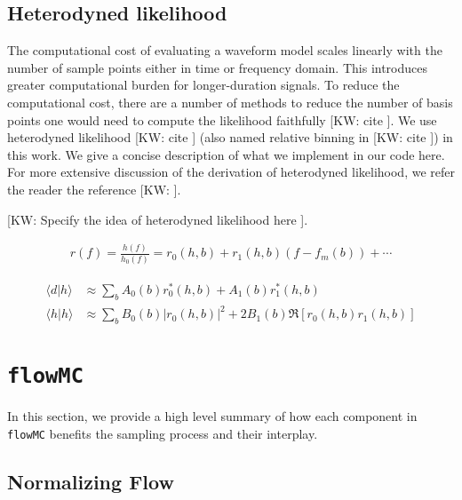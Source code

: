 \documentclass[twocolumn]{aastex631}
\newcommand{\kw}[1]{{\color{rb4}[KW: #1 ]}}
\begin{document}
\subsection{Heterodyned likelihood}

The computational cost of evaluating a waveform model scales linearly with the
number of sample points either in time or frequency domain. This introduces
greater computational burden for longer-duration signals. To reduce the
computational cost, there are a number of methods to reduce the number of basis
points one would need to compute the likelihood faithfully \kw{cite}. We use
heterodyned likelihood \kw{cite} (also named relative binning in \kw{cite}) in
this work. We give a concise description of what we implement in our code here.
For more extensive discussion of the derivation of heterodyned likelihood, we
refer the reader the reference \kw{}.

\kw{Specify the idea of heterodyned likelihood here}.

\begin{align}
r(f) = \frac{h(f)}{h_0(f)} = r_0(h,b) + r_1(h,b)(f- f_m(b)) + \cdots
\end{align}

\begin{align}
    \langle d|h \rangle &\approx \sum_b A_0(b) r^*_0(h,b) + A_1(b) r^*_1(h,b) \nonumber \\
    \langle h|h \rangle &\approx \sum_b B_0(b) |r_0(h,b)|^2 + 2 B_1(b) \Re[r_0(h,b)r_1(h,b)]
\end{align}

\section{\texttt{flowMC}}
\label{sec: flowMC}

In this section, we provide a high level summary of how each component in
\texttt{flowMC} benefits the sampling process and their interplay.


\subsection{Normalizing Flow}
\label{sec:flow}
\end{document}
